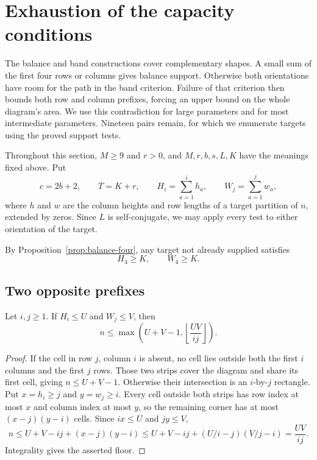 \section{Exhaustion of the capacity conditions}
\label{sec:capacity}

The balance and band constructions cover complementary shapes. A small
sum of the first four rows or columns gives balance support. Otherwise
both orientations have room for the path in the band criterion. Failure
of that criterion then bounds both row and column prefixes, forcing an
upper bound on the whole diagram's area. We use this contradiction for
large parameters and for most intermediate parameters. Nineteen pairs
remain, for which we enumerate targets using the proved support tests.

Throughout this section, $M\ge9$ and $r>0$, and $M,r,b,s,L,K$ have
the meanings fixed above. Put
\[
 c=2b+2,\qquad T=K+r,
 \qquad H_i=\sum_{a=1}^i h_a,\qquad W_j=\sum_{a=1}^j w_a,
\]
where $h$ and $w$ are the column heights and row lengths of a target
partition of $n$, extended by zeros. Since $L$ is self-conjugate, we
may apply every test to either orientation of the target.

By Proposition~\ref{prop:balance-four}, any target not already
supplied satisfies
\begin{equation}
 H_4\ge K,\qquad W_4\ge K.
 \label{eq:capacity-four-assumption}
\end{equation}

\subsection{Two opposite prefixes}

\begin{lemma}
\label{lem:capacity-rectangle}
Let $i,j\ge1$. If $H_i\le U$ and $W_j\le V$, then
\begin{equation}
 n\le\max\left(U+V-1,
              \left\lfloor\frac{UV}{ij}\right\rfloor\right).
 \label{eq:capacity-rectangle}
\end{equation}
\end{lemma}

\begin{proof}
If the cell in row $j$, column $i$ is absent, no cell lies outside
both the first $i$ columns and the first $j$ rows. Those two strips
cover the diagram and share its first cell, giving $n\le U+V-1$.
Otherwise their intersection is an $i$-by-$j$ rectangle. Put
$x=h_i\ge j$ and $y=w_j\ge i$. Every cell outside both strips has
row index at most $x$ and column index at most $y$, so the remaining
corner has at most $(x-j)(y-i)$ cells. Since $ix\le U$ and $jy\le V$,
\[
 n\le U+V-ij+(x-j)(y-i)
 \le U+V-ij+(U/i-j)(V/j-i)=\frac{UV}{ij}.
\]
Integrality gives the asserted floor.
\end{proof}

